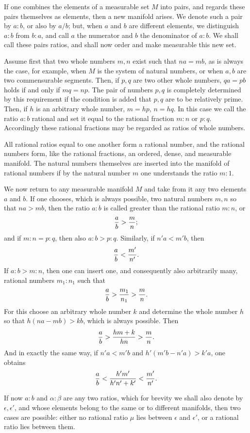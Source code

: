 \documentclass[11pt]{article}
\begin{document}
If one combines the elements of a measurable set $M$ into pairs, and regards these pairs themselves as elements, then a new manifold arises. We denote such a pair by $a:b$, or also by $a/b$; but, when $a$ and $b$ are different elements, we distinguish $a:b$ from $b:a$, and call $a$ the numerator and $b$ the denominator of $a:b$. We shall call these pairs ratios, and shall now order and make measurable this new set.

Assume first that two whole numbers $m,n$ exist such that $na=mb$, as is always the case, for example, when $M$ is the system of natural numbers, or when $a,b$ are two commensurable segments. Then, if $p,q$ are two other whole numbers, $qa=pb$ holds if and only if $mq=np$. The pair of numbers $p,q$ is completely determined by this requirement if the condition is added that $p,q$ are to be relatively prime. Then, if $h$ is an arbitrary whole number, $m=hp$, $n=hq$. In this case we call the ratio $a:b$ rational and set it equal to the rational fraction $m:n$ or $p:q$. Accordingly these rational fractions may be regarded as ratios of whole numbers.

All rational ratios equal to one another form a rational number, and the rational numbers form, like the rational fractions, an ordered, dense, and measurable manifold. The natural numbers themselves are inserted into the manifold of rational numbers if by the natural number $m$ one understands the ratio $m:1$.

We now return to any measurable manifold $M$ and take from it any two elements $a$ and $b$. If one chooses, which is always possible, two natural numbers $m,n$ so that $na>mb$, then the ratio $a:b$ is called greater than the rational ratio $m:n$, or
\[
 {a\over b}>{m\over n};
\]
and if $m:n=p:q$, then also $a:b>p:q$. Similarly, if $n'a<m'b$, then
\[
 {a\over b}<{m'\over n'}.
\]
If $a:b>m:n$, then one can insert one, and consequently also arbitrarily many, rational numbers $m_1:n_1$ such that
\[
 {a\over b}>{m_1\over n_1}>{m\over n}.
\]
For this choose an arbitrary whole number $k$ and determine the whole number $h$ so that $h(na-mb)>kb$, which is always possible. Then
\[
 {a\over b}>{hm+k\over hn}>{m\over n}.
\]
And in exactly the same way, if $n'a<m'b$ and $h'(m'b-n'a)>k'a$, one obtains
\[
 {a\over b}<{h'm'
\over h'n'+k'}<{m'
\over n'}.
\]

If now $a:b$ and $\alpha:\beta$ are any two ratios, which for brevity we shall also denote by $\epsilon,\epsilon'$, and whose elements belong to the same or to different manifolds, then two cases are possible: either no rational ratio $\mu$ lies between $\epsilon$ and $\epsilon'$, or a rational ratio lies between them.
\end{document}
